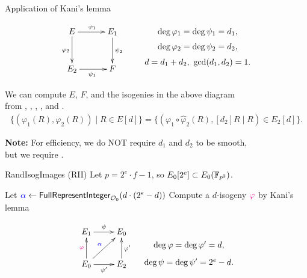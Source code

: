 \begin{frame}{Application of Kani's lemma}

    \vspace{-10pt}
    \begin{align*}
        \xymatrix@C=30pt@R=30pt{
            E \ar[r]^{\varphi_1} \ar[d]_{\varphi_2} & E_1 \ar[d]^{\psi_2}\\
            E_2 \ar[r]_{\psi_1} & F
        }
        \qquad
        \xymatrix@R=0.3em{
            \deg\varphi_1 = \deg\psi_1 = d_1,\\
            \deg\varphi_2 = \deg\psi_2 = d_2,\\
            d = d_1 + d_2,\ \gcd(d_1, d_2) = 1.
        }
    \end{align*}

    \vspace{10pt}
    We can compute $E$, $F$, and the isogenies in the above diagram\\
    from , , , , and .
    \begin{align*}
        \{(\varphi_1(R), \varphi_2(R)) \mid R \in E[d]\}
        = \{(\varphi_1\circ\hat{\varphi}_2(R), [d_2]R \mid R) \in E_2[d]\}.
    \end{align*}
   
    \vspace{10pt}
    \textbf{Note:}
    For efficiency, we do NOT require $d_1$ and $d_2$ to be smooth,\\
     but we require .
\end{frame}

\begin{frame}{RandIsogImages (RII)}
    Let $p = 2^e \cdot f - 1$, so $E_0[2^e] \subset E_0(\mathbb{F}_{p^2})$.

    \vspace{5pt}
    \begin{algorithm}[H]
        \caption{\textsf{RandIsogImages} \cite{C:NakOnu24}}
        \BlankLine
        Let $\textcolor{blue}{\alpha} \leftarrow \textsf{FullRepresentInteger}_{\mathcal{O}_0}(d\cdot(2^{e} - d))$\;
        Compute a $d$-isogeny $\textcolor{magenta}{\varphi}$ by Kani's lemma\;
        \Return{$\varphi$}\;
    \end{algorithm}

    \vspace*{5pt}
    \begin{equation*}
        \xymatrix{
            E_1 \ar[r]^{\psi} & E_0\\
            E_0 \ar[u]^{\magenta{\varphi}} \ar[ur]^{\blue{\alpha}} \ar[r]_{\psi'} & E_2 \ar[u]_{\varphi'}
        }
        \hspace*{10pt}
        \xymatrix@R=5pt{
            \\
            \deg\varphi = \deg\varphi' = d,\\
            \deg\psi = \deg\psi' = 2^{e} - d.
        }
    \end{equation*}
\end{frame}